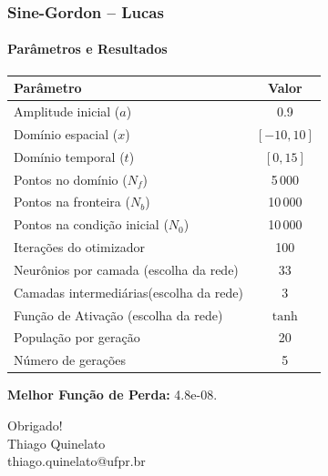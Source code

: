 \documentclass[usenames,dvipsnames,brazil,aspectratio=169]{beamer}
\begin{document}
\begin{frame}[t]
    \frametitle{Sine-Gordon -- Lucas}
    \framesubtitle{Parâmetros e Resultados}
        \begin{table}[H]
        \centering
        \begin{tabular}{|l|c|}
            \hline
            \textbf{Parâmetro} & \textbf{Valor} \\
            \hline
            Amplitude inicial ($a$) & 0.9 \\
            Domínio espacial ($x$) & $[-10, 10]$ \\
            Domínio temporal ($t$) & $[0, 15]$ \\
            Pontos no domínio ($N_f$) & 5\,000 \\
            Pontos na fronteira ($N_b$) & 10\,000 \\
            Pontos na condição inicial ($N_0$) & 10\,000 \\
            Iterações do otimizador & 100 \\
            Neurônios por camada (escolha da rede) & 33 \\
            Camadas intermediárias(escolha da rede) & 3 \\
            Função de Ativação (escolha da rede) & $\tanh$ \\
            População por geração & 20 \\
            Número de gerações & 5 \\
            \hline
        \end{tabular}
    \end{table}
   \textbf{Melhor Função de Perda:} 4.8e-08. \vspace{1cm}
\end{frame}



\begin{frame}[noframenumbering]
    \begin{center}
        {\Huge{Obrigado!}}\\
        \vfill
        Thiago Quinelato\\
        thiago.quinelato@ufpr.br
    \end{center}
\end{frame}
\end{document}
